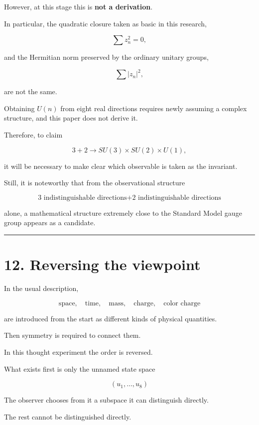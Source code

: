 \documentclass[
  a4paper,
]{article}
\begin{document}
However, at this stage this is \textbf{not a derivation}.

In particular, the quadratic closure taken as basic in this research,

\[
\sum z_n^2=0 ,
\]

and the Hermitian norm preserved by the ordinary unitary groups,

\[
\sum |z_n|^2 ,
\]

are not the same.

Obtaining \(U(n)\) from eight real directions requires newly assuming a
complex structure, and this paper does not derive it.

Therefore, to claim

\[
3+2
\rightarrow
SU(3)\times SU(2)\times U(1),
\]

it will be necessary to make clear which observable is taken as the
invariant.

Still, it is noteworthy that from the observational structure

\[
\boxed{
\text{3 indistinguishable directions}
+
\text{2 indistinguishable directions}
}
\]

alone, a mathematical structure extremely close to the Standard Model
gauge group appears as a candidate.

\begin{center}\rule{0.5\linewidth}{0.5pt}\end{center}

\section{12. Reversing the viewpoint}\label{reversing-the-viewpoint}

In the usual description,

\[
\text{space},
\quad
\text{time},
\quad
\text{mass},
\quad
\text{charge},
\quad
\text{color charge}
\]

are introduced from the start as different kinds of physical quantities.

Then symmetry is required to connect them.

In this thought experiment the order is reversed.

What exists first is only the unnamed state space

\[
\boxed{
(u_1,\ldots,u_8)
}
\]

The observer chooses from it a subspace it can distinguish directly.

The rest cannot be distinguished directly.
\end{document}
